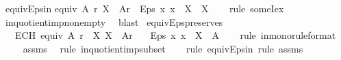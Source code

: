 \begin{isabellebody}
{\isafolddocument}%
%
\isadelimdocument
%
\endisadelimdocument
{}\isamarkupfalse%
\ equiv{\isacharunderscore}{\kern0pt}Eps{\isacharunderscore}{\kern0pt}in{\isacharcolon}{\kern0pt}\isanewline
{\isachardoublequoteopen}{\isasymlbrakk}equiv\ A\ r{\isacharsemicolon}{\kern0pt}\ X\ {\isasymin}\ A{\isacharslash}{\kern0pt}{\isacharslash}{\kern0pt}r{\isasymrbrakk}\ {\isasymLongrightarrow}\ Eps\ {\isacharparenleft}{\kern0pt}{\isasymlambda}x{\isachardot}{\kern0pt}\ x\ {\isasymin}\ X{\isacharparenright}{\kern0pt}\ {\isasymin}\ X{\isachardoublequoteclose}\isanewline
%
\isadelimproof
\ \ %
\endisadelimproof
%
\isatagproof
{}\isamarkupfalse%
\ {\isacharparenleft}{\kern0pt}rule\ someI{}{\isacharunderscore}{\kern0pt}ex{\isacharparenright}{\kern0pt}\isanewline
\ \ \isamarkupfalse%
\ in{\isacharunderscore}{\kern0pt}quotient{\isacharunderscore}{\kern0pt}imp{\isacharunderscore}{\kern0pt}non{\isacharunderscore}{\kern0pt}empty\ \isamarkupfalse%
\ blast%
\endisatagproof
{\isafoldproof}%
%
\isadelimproof
\isanewline
%
\endisadelimproof
\isanewline
{}\isamarkupfalse%
\ equiv{\isacharunderscore}{\kern0pt}Eps{\isacharunderscore}{\kern0pt}preserves{\isacharcolon}{\kern0pt}\isanewline
\ \ \ ECH{\isacharcolon}{\kern0pt}\ {\isachardoublequoteopen}equiv\ A\ r{\isachardoublequoteclose}\ \ X{\isacharcolon}{\kern0pt}\ {\isachardoublequoteopen}X\ {\isasymin}\ A{\isacharslash}{\kern0pt}{\isacharslash}{\kern0pt}r{\isachardoublequoteclose}\isanewline
\ \ \ {\isachardoublequoteopen}Eps\ {\isacharparenleft}{\kern0pt}{\isasymlambda}x{\isachardot}{\kern0pt}\ x\ {\isasymin}\ X{\isacharparenright}{\kern0pt}\ {\isasymin}\ A{\isachardoublequoteclose}\isanewline
%
\isadelimproof
\ \ %
\endisadelimproof
%
\isatagproof
{}\isamarkupfalse%
\ {\isacharparenleft}{\kern0pt}rule\ in{\isacharunderscore}{\kern0pt}mono{\isacharbrackleft}{\kern0pt}rule{\isacharunderscore}{\kern0pt}format{\isacharbrackright}{\kern0pt}{\isacharparenright}{\kern0pt}\isanewline
\ \ \ \isamarkupfalse%
\ assms\ \isamarkupfalse%
\ {\isacharparenleft}{\kern0pt}rule\ in{\isacharunderscore}{\kern0pt}quotient{\isacharunderscore}{\kern0pt}imp{\isacharunderscore}{\kern0pt}subset{\isacharparenright}{\kern0pt}\isanewline
\ \ \isamarkupfalse%
\ {\isacharparenleft}{\kern0pt}rule\ equiv{\isacharunderscore}{\kern0pt}Eps{\isacharunderscore}{\kern0pt}in{\isacharparenright}{\kern0pt}\ {\isacharparenleft}{\kern0pt}rule\ assms{\isacharparenright}{\kern0pt}{\isacharplus}{\kern0pt}%

\end{isabellebody}
